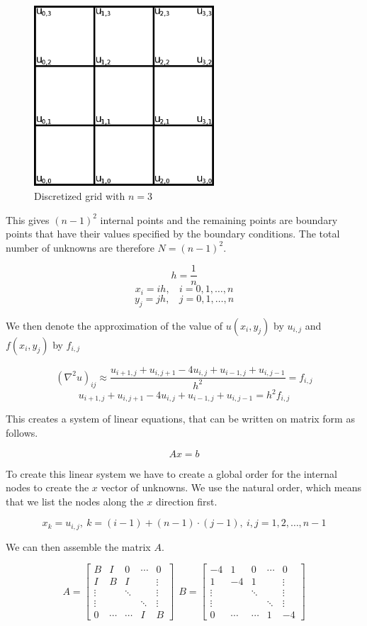 \begin{figure}[ht]
	\center
	\includegraphics[width=0.6\textwidth]{images/2d_poisson_ex}
	\caption{Discretized grid with $n = 3$}
	\label{fig:discgrid}
\end{figure}

This gives $(n-1)^2$ internal points and the remaining points are boundary
points that have their values specified by the boundary conditions. The total
number of unknowns are therefore $N = (n-1)^2$.

$$h = \frac{1}{n}$$
$$x_i = ih, ~~~~ i = 0, 1, \dots, n$$
$$y_j = jh, ~~~~ j = 0, 1, \dots, n$$

We then denote the approximation of the value of $u(x_i, y_j)$ by $u_{i,j}$ and 
$f(x_i, y_j)$ by $f_{i,j}$

$$ (\nabla^2 u)_{ij} \approx \frac{u_{i+1,j} + u_{i,j+1} - 4u_{i,j} + u_{i-1,j} + u_{i,j-1}}{h^2} = f_{i,j} $$
$$ u_{i+1,j} + u_{i,j+1} - 4u_{i,j} + u_{i-1,j} + u_{i,j-1} = h^2 f_{i,j} $$

This creates a system of linear equations, that can be written on matrix form as
follows.

$$Ax = b$$

To create this linear system we have to create a global order for the
internal nodes to create the $x$ vector of unknowns. We use the natural
order, which means that we list the nodes along the $x$ direction first.

$$x_k = u_{i,j}, ~ k = (i-1) + (n-1) \cdot (j-1), ~ i, j = 1, 2, \dots, n-1$$

We can then assemble the matrix $A$.

$$
A = \begin{bmatrix}
 B & I & 0 & \cdots & 0 \\
 I & B & I &   & \vdots \\
 \vdots &   & \ddots &   & \vdots \\
 \vdots &   &   & \ddots & \vdots \\
 0 & \cdots & \cdots & I & B 
\end{bmatrix}
~~
B = \begin{bmatrix}
-4 & 1 & 0 & \cdots & 0 \\
 1 &-4 & 1 &   & \vdots \\
 \vdots &   & \ddots &   & \vdots \\
 \vdots &   &   & \ddots & \vdots \\
 0 & \cdots & \cdots & 1 &-4 
\end{bmatrix}
$$

